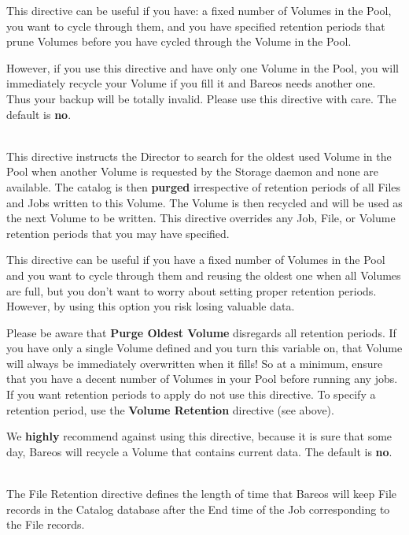\begin{description}
This directive can be useful if you have: a fixed number of Volumes in
the Pool, you want to cycle through them, and you have specified
retention periods that prune Volumes before you have cycled through the
Volume in the Pool.

However, if you use this directive and have only one Volume in the Pool,
you will immediately recycle your Volume if you fill it and Bareos needs
another one.  Thus your backup will be totally invalid.  Please use this
directive with care.  The default is {\bf no}.

\label{PurgeOldest}
\item [Purge Oldest Volume = {\textless}yes{\textbar}no{\textgreater}] \hfill \\
This directive instructs the Director to search for the oldest used
Volume in the Pool when another Volume is requested by the Storage
daemon and none are available.  The catalog is then {\bf purged}
irrespective of retention periods of all Files and Jobs written to this
Volume.  The Volume is then recycled and will be used as the next Volume
to be written.  This directive overrides any Job, File, or Volume
retention periods that you may have specified.

This directive can be useful if you have a fixed number of Volumes in
the Pool and you want to cycle through them and reusing the oldest one
when all Volumes are full, but you don't want to worry about setting
proper retention periods.  However, by using this option you risk losing
valuable data.

Please be aware that {\bf Purge Oldest Volume} disregards all retention
periods. If you have only a single Volume defined and you turn this
variable on, that Volume will always be immediately overwritten when it
fills!  So at a minimum, ensure that you have a decent number of Volumes
in your Pool before running any jobs.  If you want retention periods to
apply do not use this directive.  To specify a retention period, use the
{\bf Volume Retention} directive (see above).

We {\bf highly} recommend against using this directive, because it is
sure that some day, Bareos will recycle a Volume that contains current
data.  The default is {\bf no}.

\item [File Retention = {\textless}time-period-specification{\textgreater}] \hfill \\
The File Retention directive defines the length of time that  Bareos will
keep File records in the Catalog database after the End time of the
Job corresponding to the File records.


\end{description}
